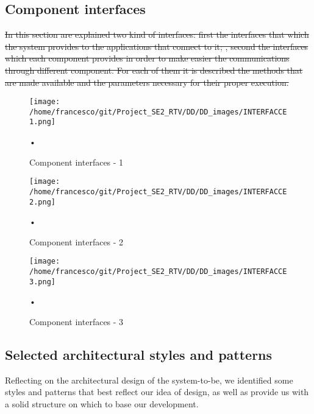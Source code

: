 \documentclass[10pt, a4paper,titlepage]{article}
\begin{document}
\subsection{Component interfaces}
\sout{In this section are explained two kind of interfaces: first the interfaces that which the system provides to the applications that connect to it; , second the interfaces which each component provides in order to make easier the communications through different component. For each of them it is described the methods that are made available and the parameters necessary for their proper execution.}
\begin{figure}[h]
\begin{center}
\texttt{[image: /home/francesco/git/Project\_SE2\_RTV/DD/DD\_images/INTERFACCE1.png]}
\caption{Component interfaces - 1}
\label{fig:scomponent_interfaces}
\end{center}•
\end{figure}
\begin{figure}[h]
\begin{center}
\texttt{[image: /home/francesco/git/Project\_SE2\_RTV/DD/DD\_images/INTERFACCE2.png]}
\caption{Component interfaces - 2}
\label{fig:scomponent_interfaces}
\end{center}•
\end{figure}
\begin{figure}[h]
\begin{center}
\texttt{[image: /home/francesco/git/Project\_SE2\_RTV/DD/DD\_images/INTERFACCE3.png]}
\caption{Component interfaces - 3}
\label{fig:scomponent_interfaces}
\end{center}•
\end{figure}
\subsection{Selected architectural styles and patterns}
Reflecting on the architectural design of the system-to-be, we identified some styles and patterns that best reflect our idea of design, as well as provide us with a solid structure on which to base our development.
\end{document}
